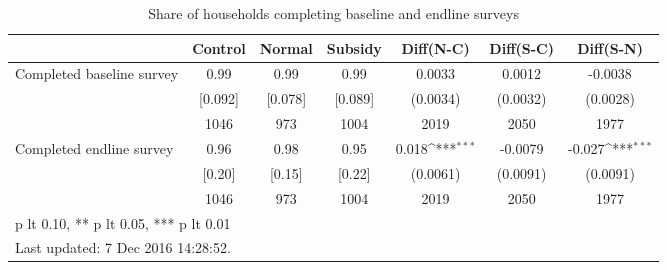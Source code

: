\begin{table}[htbp]\centering
\def\sym#1{\ifmmode^{#1}\else\(^{#1}\)\fi}
\caption{Share of households completing baseline and endline surveys \label{tab:"balance"}}
\begin{tabular*}{1\hsize}{@{\hskip\tabcolsep\extracolsep\fill}l*{1}{cccccc}}
\toprule
                                &  Control&   Normal&  Subsidy&Diff(N-C)         &Diff(S-C)         &Diff(S-N)         \\
\midrule
Completed baseline survey       &     0.99&     0.99&     0.99&   0.0033         &   0.0012         &  -0.0038         \\
                                &  [0.092]&  [0.078]&  [0.089]& (0.0034)         & (0.0032)         & (0.0028)         \\
                                &     1046&      973&     1004&     2019         &     2050         &     1977         \\
Completed endline survey        &     0.96&     0.98&     0.95&    0.018\sym{***}&  -0.0079         &   -0.027\sym{***}\\
                                &   [0.20]&   [0.15]&   [0.22]& (0.0061)         & (0.0091)         & (0.0091)         \\
                                &     1046&      973&     1004&     2019         &     2050         &     1977         \\
\bottomrule
\multicolumn{7}{l}{\footnotesize * p lt 0.10, ** p lt 0.05, *** p lt 0.01}\\
\multicolumn{7}{l}{\footnotesize Last updated:  7 Dec 2016 14:28:52.}\\
\end{tabular*}
\end{table}
